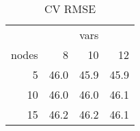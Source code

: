 \begin{table}

\caption{\label{tab:}CV RMSE}
\centering
\begin{tabular}[t]{r|r|r|r}
\hline
\multicolumn{1}{c|}{ } & \multicolumn{3}{c}{vars} \\
\cline{2-4}
nodes & 8 & 10 & 12\\
\hline
5 & 46.0 & 45.9 & 45.9\\
\hline
10 & 46.0 & 46.0 & 46.1\\
\hline
15 & 46.2 & 46.2 & 46.1\\
\hline
\end{tabular}
\end{table}